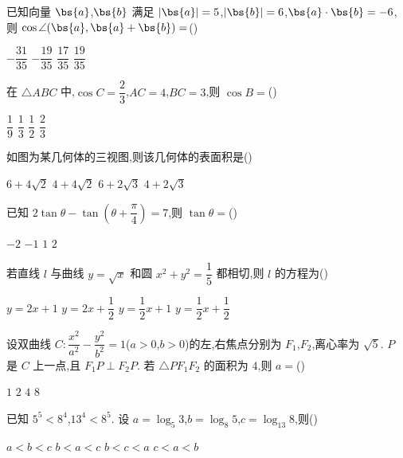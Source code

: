 \begin{problem}
已知向量 \(\bs{a}\),\(\bs{b}\) 满足 \(|\bs{a}|=5\),\(|\bs{b}|=6\),\(\bs{a}\cdot\bs{b}=-6\),则 \(\cos\angle(\bs{a},\bs{a}+\bs{b})=\)(\quad)

\choices
    {\(-\dfrac{31}{35}\)}
    {\(-\dfrac{19}{35}\)}
    {\(\dfrac{17}{35}\)}
    {\(\dfrac{19}{35}\)}
\end{problem}

\begin{problem}
在 \(\triangle ABC\) 中,\(\cos C=\dfrac{2}{3}\),\(AC=4\),\(BC=3\),则 \(\cos B=\)(\quad)

\choices
    {\(\dfrac{1}{9}\)}
    {\(\dfrac{1}{3}\)}
    {\(\dfrac{1}{2}\)}
    {\(\dfrac{2}{3}\)}
\end{problem}

\begin{problem}
如图为某几何体的三视图,则该几何体的表面积是(\quad)


\choices
    {\(6+4\sqrt{2}\)}
    {\(4+4\sqrt{2}\)}
    {\(6+2\sqrt{3}\)}
    {\(4+2\sqrt{3}\)}
\end{problem}

\begin{problem}
已知 \(2\tan\theta-\tan\left( \theta+\dfrac{\pi}{4} \right)=7\),则 \(\tan\theta=\)(\quad)

\choices
    {\(-2\)}
    {\(-1\)}
    {\(1\)}
    {\(2\)}
\end{problem}

\begin{problem}
若直线 \(l\) 与曲线 \(y=\sqrt{x}\) 和圆 \(x^2+y^2=\dfrac{1}{5}\) 都相切,则 \(l\) 的方程为(\quad)

\choices
    {\(y=2x+1\)}
    {\(y=2x+\dfrac{1}{2}\)}
    {\(y=\dfrac{1}{2}x+1\)}
    {\(y=\dfrac{1}{2}x+\dfrac{1}{2}\)}
\end{problem}

\begin{problem}
设双曲线 \(C:\dfrac{x^2}{a^2}-\dfrac{y^2}{b^2}=1\)(\(a>0\),\(b>0\))的左,右焦点分别为 \(F_1\),\(F_2\),离心率为 \(\sqrt{5}\). \(P\) 是 \(C\) 上一点,且 \(F_1P\perp F_2P\). 若 \(\triangle PF_1F_2\) 的面积为 \(4\),则 \(a=\)(\quad)

\choices
    {\(1\)}
    {\(2\)}
    {\(4\)}
    {\(8\)}
\end{problem}

\begin{problem}
已知 \(5^5<8^4\),\(13^4<8^5\). 设 \(a=\log_5 3\),\(b=\log_8 5\),\(c=\log_{13} 8\),则(\quad)

\choices
    {\(a<b<c\)}
    {\(b<a<c\)}
    {\(b<c<a\)}
    {\(c<a<b\)}
\end{problem}

